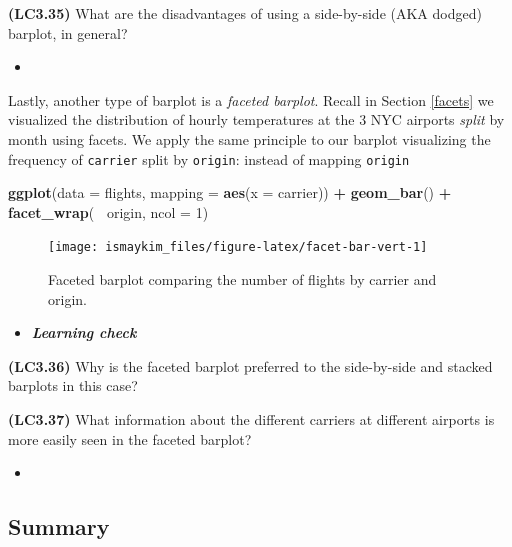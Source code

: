 \documentclass[12pt, krantz2,]{krantz}
\makeatletter
\newenvironment{Shaded}{\begin{snugshade}}{\end{snugshade}}
\newcommand{\DataTypeTok}[1]{\textcolor[rgb]{0.27,0.27,0.27}{#1}}
\newcommand{\DecValTok}[1]{\textcolor[rgb]{0.06,0.06,0.06}{#1}}
\newcommand{\KeywordTok}[1]{\textcolor[rgb]{0.27,0.27,0.27}{\textbf{#1}}}
\newcommand{\NormalTok}[1]{#1}
\newcommand{\OperatorTok}[1]{\textcolor[rgb]{0.43,0.43,0.43}{\textbf{#1}}}
\newcommand{\StringTok}[1]{\textcolor[rgb]{0.5,0.5,0.5}{#1}}
\newenvironment{kframe}{%
\medskip{}
\setlength{\fboxsep}{.8em}
 \def\at@end@of@kframe{}%
 \ifinner\ifhmode%
  \def\at@end@of@kframe{\end{minipage}}%
  \begin{minipage}{\columnwidth}%
 \fi\fi%
 \def\FrameCommand##1{\hskip\@totalleftmargin \hskip-\fboxsep
 \colorbox{shadecolor}{##1}\hskip-\fboxsep
     \hskip-\linewidth \hskip-\@totalleftmargin \hskip\columnwidth}%
 \MakeFramed {\advance\hsize-\width
   \@totalleftmargin\z@ \linewidth\hsize
   \@setminipage}}%
 {\par\unskip\endMakeFramed%
 \at@end@of@kframe}
\renewenvironment{Shaded}{\begin{kframe}}{\end{kframe}}
\newenvironment{rmdblock}[1]
  {\begin{shaded*}
  \begin{itemize}
  \renewcommand{\labelitemi}{
    \raisebox{-.7\height}[0pt][0pt]{
    }
  }
  \item
  }
  {
  \end{itemize}
  \end{shaded*}
  }
\newenvironment{learncheck}
  {\begin{rmdblock}{warning}}
  {\end{rmdblock}}
\makeatother
\begin{document}
\textbf{(LC3.35)} What are the disadvantages of using a side-by-side (AKA dodged) barplot, in general?

\begin{learncheck}

\end{learncheck}

Lastly, another type of barplot is a \emph{faceted barplot}. Recall in Section \ref{facets} we visualized the distribution of hourly temperatures at the 3 NYC airports \emph{split} by month using facets. We apply the same principle to our barplot visualizing the frequency of \texttt{carrier} split by \texttt{origin}: instead of mapping \texttt{origin}

\begin{Shaded}
\begin{Highlighting}[]
\KeywordTok{ggplot}\NormalTok{(}\DataTypeTok{data =}\NormalTok{ flights, }\DataTypeTok{mapping =} \KeywordTok{aes}\NormalTok{(}\DataTypeTok{x =}\NormalTok{ carrier)) }\OperatorTok{+}
\StringTok{  }\KeywordTok{geom_bar}\NormalTok{() }\OperatorTok{+}
\StringTok{  }\KeywordTok{facet_wrap}\NormalTok{(}\OperatorTok{~}\StringTok{ }\NormalTok{origin, }\DataTypeTok{ncol =} \DecValTok{1}\NormalTok{)}
\end{Highlighting}
\end{Shaded}

\begin{figure}

{\centering \texttt{[image: ismaykim\_files/figure-latex/facet-bar-vert-1]} 

}

\caption{Faceted barplot comparing the number of flights by carrier and origin.}\label{fig:facet-bar-vert}
\end{figure}

\begin{learncheck}
\textbf{\emph{Learning check}}
\end{learncheck}

\textbf{(LC3.36)} Why is the faceted barplot preferred to the side-by-side and stacked barplots in this case?

\textbf{(LC3.37)} What information about the different carriers at different airports is more easily seen in the faceted barplot?

\begin{learncheck}

\end{learncheck}

\hypertarget{summary-4}{%
\subsection{Summary}\label{summary-4}}
\end{document}

